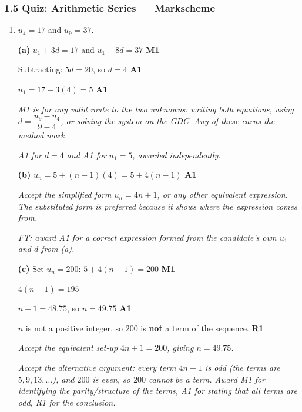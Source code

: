 \documentclass[12pt, twoside]{article}
\begin{document}
\subsubsection*{1.5 Quiz: Arithmetic Series --- Markscheme}

\begin{enumerate}[itemsep=0.3cm]

\item[1.] [Maximum mark: 7]

$u_{4} = 17$ and $u_{9} = 37$.

\medskip

\textbf{(a)} $u_{1} + 3d = 17$ \quad and \quad $u_{1} + 8d = 37$
\hfill \textbf{M1}

Subtracting: $5d = 20$, so $d = 4$ \hfill \textbf{A1}

$u_{1} = 17 - 3(4) = 5$ \hfill \textbf{A1}

\emph{M1 is for any valid route to the two unknowns: writing both
equations, using $d = \dfrac{u_{9} - u_{4}}{9 - 4}$, or solving the
system on the GDC. Any of these earns the method mark.}

\emph{A1 for $d = 4$ and A1 for $u_{1} = 5$, awarded independently.}

\medskip

\textbf{(b)} $u_{n} = 5 + (n - 1)(4) = 5 + 4(n - 1)$ \hfill \textbf{A1}

\emph{Accept the simplified form $u_{n} = 4n + 1$, or any other equivalent
expression. The substituted form is preferred because it shows where the
expression comes from.}

\emph{FT: award A1 for a correct expression formed from the
candidate's own $u_{1}$ and $d$ from (a).}

\medskip

\textbf{(c)} Set $u_{n} = 200$: \quad $5 + 4(n - 1) = 200$
\hfill \textbf{M1}

$4(n - 1) = 195$

$n - 1 = 48.75$, so $n = 49.75$ \hfill \textbf{A1}

$n$ is not a positive integer, so $200$ is \textbf{not} a term of the
sequence. \hfill \textbf{R1}

\emph{Accept the equivalent set-up $4n + 1 = 200$, giving $n = 49.75$.}

\emph{Accept the alternative argument: every term $4n + 1$ is odd
(the terms are $5, 9, 13, \ldots$), and $200$ is even, so $200$
cannot be a term. Award M1 for identifying the parity/structure of the
terms, A1 for stating that all terms are odd, R1 for the
conclusion.}


\end{enumerate}
\end{document}
